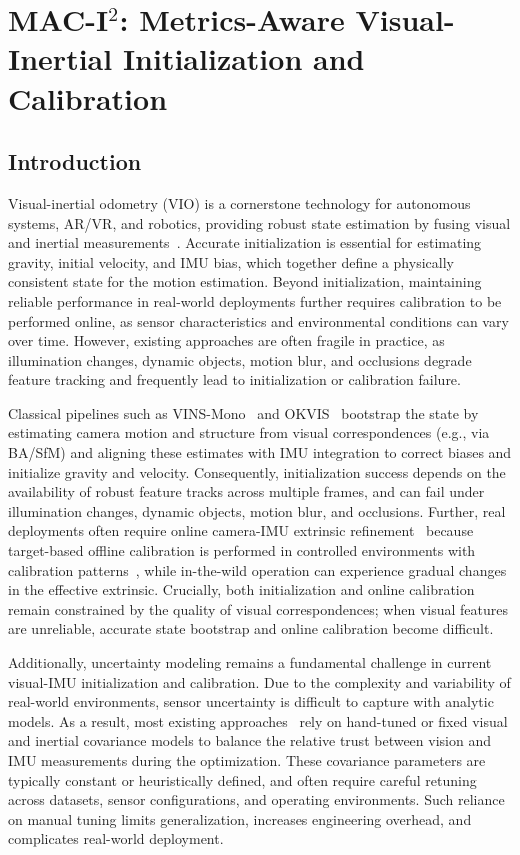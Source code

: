 \chapter{MAC-I$^2$: Metrics-Aware Visual-Inertial Initialization and Calibration} \label{chapter:macinit}

\section{Introduction}
\label{sec:maci2:intro}

Visual-inertial odometry (VIO) is a cornerstone technology for autonomous systems, AR/VR, and robotics, providing robust state estimation by fusing visual and inertial measurements~\cite{qin2018vins}. 
Accurate initialization is essential for estimating gravity, initial velocity, and IMU bias, which together define a physically consistent state for the motion estimation. 
Beyond initialization, maintaining reliable performance in real-world deployments further requires calibration to be performed online, as sensor characteristics and environmental conditions can vary over time. 
However, existing approaches are often fragile in practice, as illumination changes, dynamic objects, motion blur, and occlusions degrade feature tracking and frequently lead to initialization or calibration failure. 

Classical pipelines such as VINS-Mono~\cite{qin2018vins} and OKVIS~\cite{leutenegger2015keyframe} bootstrap the state by estimating camera motion and structure from visual correspondences (e.g., via BA/SfM) and aligning these estimates with IMU integration to correct biases and initialize gravity and velocity. 
Consequently, initialization success depends on the availability of robust feature tracks across multiple frames, and can fail under illumination changes, dynamic objects, motion blur, and occlusions.
Further, real deployments often require online camera-IMU extrinsic refinement~\cite{li2023stereo} because target-based offline calibration is performed in controlled environments with calibration patterns~\cite{furgale2013unified}, while in-the-wild operation can experience gradual changes in the effective extrinsic. 
Crucially, both initialization and online calibration remain constrained by the quality of visual correspondences; when visual features are unreliable, accurate state bootstrap and online calibration become difficult.

Additionally, uncertainty modeling remains a fundamental challenge in current visual-IMU initialization and calibration.
Due to the complexity and variability of real-world environments, sensor uncertainty is difficult to capture with analytic models.
As a result, most existing approaches~\cite{qin2018vins, geneva2020openvins} rely on hand-tuned or fixed visual and inertial covariance models to balance the relative trust between vision and IMU measurements during the optimization.
These covariance parameters are typically constant or heuristically defined, and often require careful retuning across datasets, sensor configurations, and operating environments.
Such reliance on manual tuning limits generalization, increases engineering overhead, and complicates real-world deployment.

